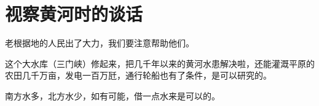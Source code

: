 \section[视察黄河时的谈话（一九五二年十月二十九日）]{视察黄河时的谈话}


老根据地的人民出了大力，我们要注意帮助他们。

这个大水库（三门峡）修起来，把几千年以来的黄河水患解决啦，还能灌溉平原的农田几千万亩，发电一百万瓩，通行轮船也有了条件，是可以研究的。

南方水多，北方水少，如有可能，借一点水来是可以的。



